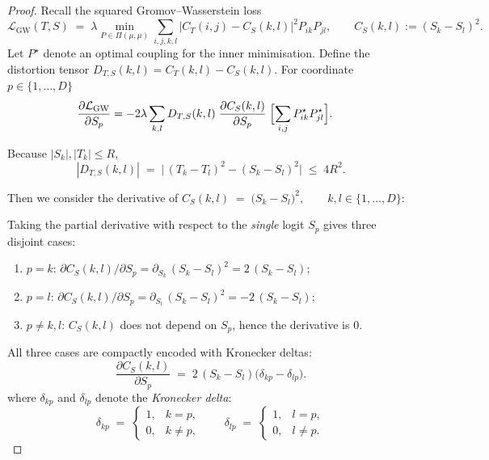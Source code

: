 \documentclass{article}
\begin{document}
\begin{proof}
Recall the squared Gromov–Wasserstein loss
\[
  \mathcal{L}_{\mathrm{GW}}(T,S)
  \;=\;
  \lambda
  \min_{P\in\Pi(\mu,\mu)}
  \sum_{i,j,k,l}
  \bigl|C_{T}(i,j)-C_{S}(k,l)\bigr|^{2} P_{ik} P_{jl},
  \qquad
  C_{S}(k,l):=(S_{k}-S_{l})^{2}.
\]
Let \(P^{\star}\) denote an optimal coupling for the inner minimisation.
Define the distortion tensor
\(D_{T,S}(k,l)=C_{T}(k,l)-C_{S}(k,l)\).
For coordinate \(p\in\{1,\dots,D\}\)
\begin{align*}
  \frac{\partial\mathcal{L}_{\mathrm{GW}}}{\partial S_{p}}
  &=
    -2\lambda
    \sum_{k,l}
    D_{T,S}(k,l)\;
    \frac{\partial C_{S}(k,l)}{\partial S_{p}}
    \;\Bigl[\sum_{i,j}P^{\star}_{ik}P^{\star}_{jl}\Bigr].
\end{align*}

Because \(|S_{k}|,|T_{k}|\le R\),
\[
  |D_{T,S}(k,l)|
  \;=\;
  \bigl|\,(T_{k}-T_{l})^{2}-(S_{k}-S_{l})^{2}\bigr|
  \;\le\;
  4R^{2}.
\tag{A.1}
\]

Then we consider the derivative of $C_{S}(k,l)\;=\;\bigl(S_{k}-S_{l}\bigr)^{2},
  \qquad k,l\in\{1,\dots,D\}$:

Taking the partial derivative with respect to the \emph{single} logit
$S_{p}$ gives three disjoint cases:

\begin{enumerate}
\item $p=k$:\;
      $\displaystyle
        \partial C_{S}(k,l)/\partial S_{p}
        =\partial_{S_{k}}\,(S_{k}-S_{l})^{2}
        =2\,(S_{k}-S_{l})$;
\item $p=l$:\;
      $\displaystyle
        \partial C_{S}(k,l)/\partial S_{p}
        =\partial_{S_{l}}\,(S_{k}-S_{l})^{2}
        =-2\,(S_{k}-S_{l})$;
\item $p\neq k,l$:\;
      $C_{S}(k,l)$ does not depend on $S_{p}$, hence the derivative is $0$.
\end{enumerate}

All three cases are compactly encoded with Kronecker deltas:
\begin{equation}
  \frac{\partial C_{S}(k,l)}{\partial S_{p}}
  \;=\;
  2\,(S_{k}-S_{l})\bigl(\delta_{kp}-\delta_{lp}\bigr) .
  \label{eq:dCs}
\end{equation}
where \(\delta_{kp}\) and \(\delta_{lp}\) denote the \emph{Kronecker delta}:
\[
  \delta_{kp}\;=\;
  \begin{cases}
    1,& k = p ,\\[4pt]
    0,& k \neq p ,
  \end{cases}
  \qquad
  \delta_{lp}\;=\;
  \begin{cases}
    1,& l = p ,\\[4pt]
    0,& l \neq p .
  \end{cases}
\]


\end{proof}
\end{document}
